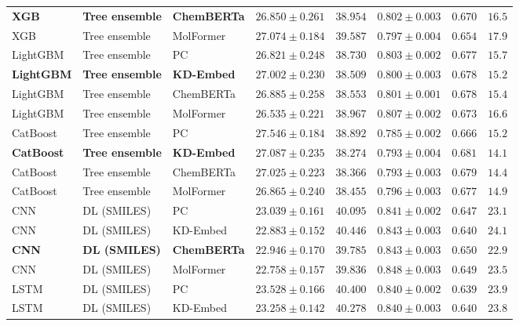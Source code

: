 \documentclass{article}
\begin{document}
\begin{table}[!ht]
{\begin{tabular}{lllccccr}
\textbf{XGB} & \textbf{Tree ensemble} & \textbf{ChemBERTa} & $\mathbf{26.850 \pm 0.261}$ & $\mathbf{38.954}$ & $\mathbf{0.802 \pm 0.003}$ & $\mathbf{0.670}$ & $\mathbf{16.5}$ \\
XGB & Tree ensemble & MolFormer & $27.074 \pm 0.184$ & $39.587$ & $0.797 \pm 0.004$ & $0.654$ & $17.9$ \\
LightGBM & Tree ensemble & PC & $26.821 \pm 0.248$ & $38.730$ & $0.803 \pm 0.002$ & $0.677$ & $15.7$ \\
\textbf{LightGBM} & \textbf{Tree ensemble} & \textbf{KD-Embed} & $\mathbf{27.002 \pm 0.230}$ & $\mathbf{38.509}$ & $\mathbf{0.800 \pm 0.003}$ & $\mathbf{0.678}$ & $\mathbf{15.2}$ \\
LightGBM & Tree ensemble & ChemBERTa & $26.885 \pm 0.258$ & $38.553$ & $0.801 \pm 0.001$ & $0.678$ & $15.4$ \\
LightGBM & Tree ensemble & MolFormer & $26.535 \pm 0.221$ & $38.967$ & $0.807 \pm 0.002$ & $0.673$ & $16.6$ \\
CatBoost & Tree ensemble & PC & $27.546 \pm 0.184$ & $38.892$ & $0.785 \pm 0.002$ & $0.666$ & $15.2$ \\
\textbf{CatBoost} & \textbf{Tree ensemble} & \textbf{KD-Embed} & $\mathbf{27.087 \pm 0.235}$ & $\mathbf{38.274}$ & $\mathbf{0.793 \pm 0.004}$ & $\mathbf{0.681}$ & $\mathbf{14.1}$ \\
CatBoost & Tree ensemble & ChemBERTa & $27.025 \pm 0.223$ & $38.366$ & $0.793 \pm 0.003$ & $0.679$ & $14.4$ \\
CatBoost & Tree ensemble & MolFormer & $26.865 \pm 0.240$ & $38.455$ & $0.796 \pm 0.003$ & $0.677$ & $14.9$ \\
\midrule
CNN & DL (SMILES) & PC & $23.039 \pm 0.161$ & $40.095$ & $0.841 \pm 0.002$ & $0.647$ & $23.1$ \\
CNN & DL (SMILES) & KD-Embed & $22.883 \pm 0.152$ & $40.446$ & $0.843 \pm 0.003$ & $0.640$ & $24.1$ \\
\textbf{CNN} & \textbf{DL (SMILES)} & \textbf{ChemBERTa} & $\mathbf{22.946 \pm 0.170}$ & $\mathbf{39.785}$ & $\mathbf{0.843 \pm 0.003}$ & $\mathbf{0.650}$ & $\mathbf{22.9}$ \\
CNN & DL (SMILES) & MolFormer & $22.758 \pm 0.157$ & $39.836$ & $0.848 \pm 0.003$ & $0.649$ & $23.5$ \\
LSTM & DL (SMILES) & PC & $23.528 \pm 0.166$ & $40.400$ & $0.840 \pm 0.002$ & $0.639$ & $23.9$ \\
LSTM & DL (SMILES) & KD-Embed & $23.258 \pm 0.142$ & $40.278$ & $0.840 \pm 0.003$ & $0.640$ & $23.8$ \\

\end{tabular}}
\end{table}
\end{document}
